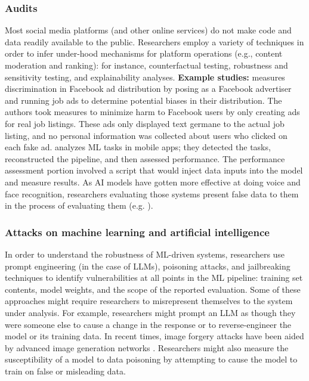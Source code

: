 \subsubsection{Audits} 
\label{sec:audits}
Most social media platforms (and other online services) do not make code and data readily available to the public. Researchers employ a variety of techniques in order to infer under-hood mechanisms for platform operations (e.g., content moderation and ranking): for instance, counterfactual testing, robustness and sensitivity testing, and explainability analyses. 
\textbf{Example studies:}
\cite{kaplanMeasurementAnalysisImplied2022} measures discrimination in Facebook ad distribution by posing as a Facebook advertiser and running job ads to determine potential biases in their distribution. The authors took measures to minimize harm to Facebook users by only creating ads for real job listings. These ads only displayed text germane to the actual job listing, and no personal information was collected about users who clicked on each fake ad. 
\cite{westPictureWorth5002024} analyzes ML tasks in mobile apps; they detected the tasks, reconstructed the pipeline, and then assessed performance.  The performance assessment portion involved a script that would inject data inputs into the model and measure results. 
As AI models have gotten more effective at doing voice and face recognition, researchers evaluating those systems present false data to them in the process of evaluating them (e.g. \cite{jiangCanHearYour,chengALIFLowCostAdversarial2024,kimScoresTellEverything2024}).

\subsubsection{Attacks on machine learning and artificial intelligence} 
\label{sec:adversarial_ml}
In order to understand the robustness of ML-driven systems, researchers use prompt engineering (in the case of LLMs), poisoning attacks, and jailbreaking techniques to identify vulnerabilities at all points in the ML pipeline: training set contents, model weights, and the scope of the reported evaluation. Some of these approaches might require researchers to misrepresent themselves to the system under analysis. For example, researchers might prompt an LLM as though they were someone else to cause a change in the response or to reverse-engineer the model or its training data. In recent times, image forgery attacks have been aided by advanced image generation networks \cite{cox2024}. Researchers might also measure the susceptibility of a model to data poisoning by attempting to cause the model to train on false or misleading data. 

